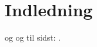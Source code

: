 \chapter{Indledning}


\lipsum[5-7] \cite{websiteAttachedProperties} og \cite{websitePlaceholder} og til sidst: \cite{websiteCustomWindow}.